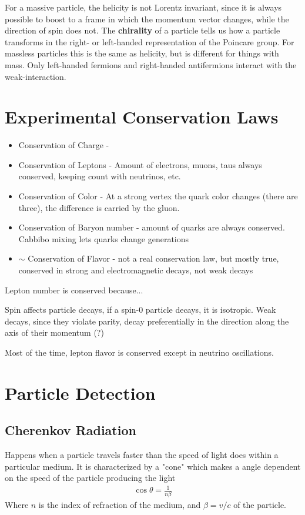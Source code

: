 For a massive particle, the helicity is not Lorentz invariant, since it is always possible to boost to a frame in which the momentum vector changes, while the direction of spin does not. The \textbf{chirality} of a particle tells us how a particle transforms in the right- or left-handed representation of the Poincare group. For massless particles this is the same as helicity, but is different for things with mass. Only left-handed fermions and right-handed antifermions interact with the weak-interaction.



\section{Experimental Conservation Laws}

\begin{itemize}
    \item Conservation of Charge - 
    \item Conservation of Leptons - Amount of electrons, muons, taus always conserved, keeping count with neutrinos, etc.
    \item Conservation of Color - At a strong vertex the quark color changes (there are three), the difference is carried by the gluon.
    \item Conservation of Baryon number - amount of quarks are always conserved. Cabbibo mixing lets quarks change generations
    \item $\sim$ Conservation of Flavor - not a real conservation law, but mostly true, conserved in strong and electromagnetic decays, not weak decays
\end{itemize}
Lepton number is conserved because...

Spin affects particle decays, if a spin-0 particle decays, it is isotropic. Weak decays, since they violate parity, decay preferentially in the direction along the axis of their momentum (?)


Most of the time, lepton flavor is conserved except in neutrino oscillations.

\section{Particle Detection}
\subsection{Cherenkov Radiation}
Happens when a particle travels faster than the speed of light does within a particular medium. It is characterized by a "cone" which makes a angle dependent on the speed of the particle producing the light
\begin{align}
\cos\theta =\frac{1}{n\beta}
\end{align}
Where $n$ is the index of refraction of the medium, and $\beta = v/c$ of the particle.


